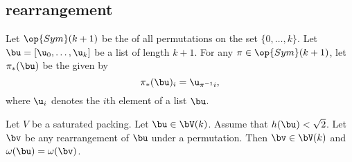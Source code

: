 \subsection{rearrangement}


Let $\op{Sym}(k+1)$ be the  of all permutations on the
set $\{0,\ldots,k\}$.  Let $\bu = [\u_0,\ldots, \u_k]$ be a list of
length $k+1$.  For any  $\pi\in\op{Sym}(k+1)$,
let $\pi_*(\bu)$ be the  given by
\begin{displaymath} 
\pi_*(\bu)_i =  \u_{\pi^{-1} i}, %
\end{displaymath}   
where $\u_i$ denotes the $i$th element of a list $\bu$.
%
%


\begin{lemma}[]   \label{lemma:perm-Vk} 
  Let $V$ be a saturated packing.  Let $\bu\in \bV(k)$.  Assume that
  $h(\bu)<\sqrt2$. Let $\bv$ be any rearrangement of $\bu$ under a
  permutation.  Then $\bv\in \bV(k)$ and $\omega(\bu) = \omega(\bv)$.
\end{lemma}

